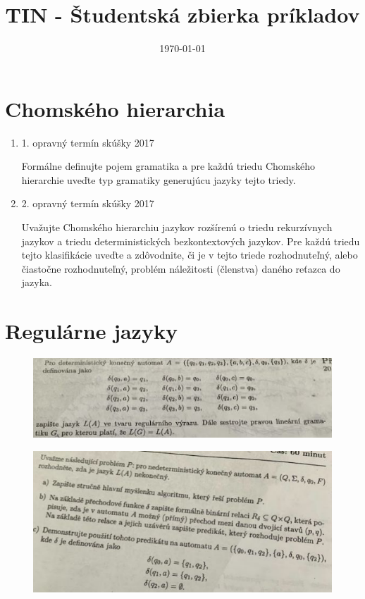 \documentclass[]{article}
\begin{document}
	
	
	\title{TIN - Študentská zbierka príkladov}
	\date{\today}
	
	\maketitle
	\newpage
	\tableofcontents
	\newpage
	
	\section{Chomského hierarchia}
	
	\begin{enumerate}
		\item 1. opravný termín skúšky 2017
		
		Formálne definujte pojem gramatika a pre každú triedu Chomského hierarchie uveďte typ gramatiky generujúcu jazyky tejto triedy.
		
		\item 2. opravný termín skúšky 2017
		
		Uvažujte Chomského hierarchiu jazykov rozšírenú o triedu rekurzívnych jazykov a triedu deterministických bezkontextových jazykov. Pre každú triedu tejto klasifikácie uveďte a zdôvodnite, či je v tejto triede rozhodnuteľný, alebo čiastočne rozhodnuteľný, problém náležitosti (členstva) daného reťazca do jazyka.
	\end{enumerate}

	\section{Regulárne jazyky}
	
	\begin{figure}[H]
		\includegraphics[width=\textwidth]{tasks/regularne/task1.png}
	\end{figure}
	
	\begin{figure}[H]
		\includegraphics[width=\textwidth]{tasks/regularne/task2.png}
	\end{figure}
	
\end{document}
